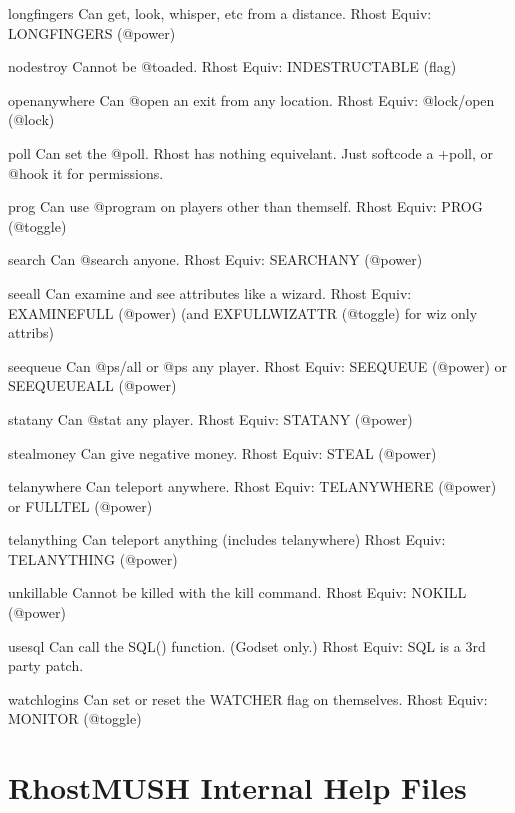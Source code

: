 \documentclass[letterpaper,10pt,english]{sphinxmanual}
\begin{document}
\begin{sphinxVerbatim}[commandchars=\\\{\}]
long\PYGZus{}fingers          Can get, look, whisper, etc from a distance.
Rhost Equiv: LONG\PYGZus{}FINGERS (@power)

no\PYGZus{}destroy            Cannot be @toad\PYGZsq{}ed.
Rhost Equiv: INDESTRUCTABLE (flag)

open\PYGZus{}anywhere         Can @open an exit from any location.
Rhost Equiv: @lock/open (@lock)

poll                  Can set the @poll.
Rhost has nothing equivelant.  Just softcode a +poll, or @hook it for permissions.

prog                  Can use @program on players other than themself.
Rhost Equiv: PROG (@toggle)

search                Can @search anyone.
Rhost Equiv: SEARCH\PYGZus{}ANY (@power)

see\PYGZus{}all               Can examine and see attributes like a wizard.
Rhost Equiv: EXAMINE\PYGZus{}FULL (@power) (and EXFULLWIZATTR (@toggle) for wiz only attribs)

see\PYGZus{}queue             Can @ps/all or @ps any player.
Rhost Equiv: SEE\PYGZus{}QUEUE (@power) or SEE\PYGZus{}QUEUE\PYGZus{}ALL (@power)

stat\PYGZus{}any              Can @stat any player.
Rhost Equiv: STAT\PYGZus{}ANY (@power)

steal\PYGZus{}money           Can give negative money.
Rhost Equiv: STEAL (@power)

tel\PYGZus{}anywhere          Can teleport anywhere.
Rhost Equiv: TEL\PYGZus{}ANYWHERE (@power) or FULL\PYGZus{}TEL (@power)

tel\PYGZus{}anything          Can teleport anything (includes tel\PYGZus{}anywhere)
Rhost Equiv: TEL\PYGZus{}ANYTHING (@power)

unkillable            Cannot be killed with the \PYGZsq{}kill\PYGZsq{} command.
Rhost Equiv: NOKILL (@power)

use\PYGZus{}sql               Can call the SQL() function. (God\PYGZhy{}set only.)
Rhost Equiv: SQL is a 3rd party patch.

watch\PYGZus{}logins          Can set or reset the WATCHER flag on themselves.
Rhost Equiv: MONITOR (@toggle)
\end{sphinxVerbatim}


\chapter{RhostMUSH Internal Help Files}
\label{\detokenize{help:rhostmush-internal-help-files}}\label{\detokenize{help::doc}}
\end{document}
